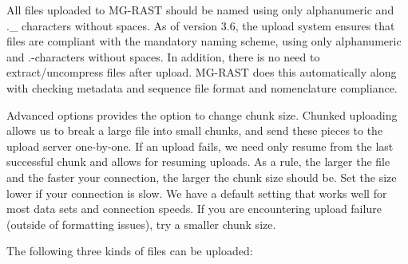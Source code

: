 \documentclass[12pt,fullpage]{report}
\begin{document}
All files uploaded to MG-RAST should be named using only alphanumeric and .\_ characters without spaces. As of version 3.6, the upload system ensures that files are compliant with the mandatory naming scheme,  using only alphanumeric and .-characters without spaces. In addition, there is no need to extract/uncompress files after upload. MG-RAST does this automatically along with checking metadata and sequence file format and nomenclature compliance. 

Advanced options provides the option to change chunk size. Chunked uploading allows us to break a large file into small chunks, and send these pieces to the upload server one-by-one. If an upload fails, we need only resume from the last successful chunk and allows for resuming uploads. As a rule, the larger the file and the faster your connection, the larger the chunk size should be. Set the size lower if your connection is slow. We have a default setting that works well for most data sets and connection speeds. If you are encountering upload failure (outside of formatting issues), try a smaller chunk size.

The following three kinds of files can be uploaded:
\end{document}
